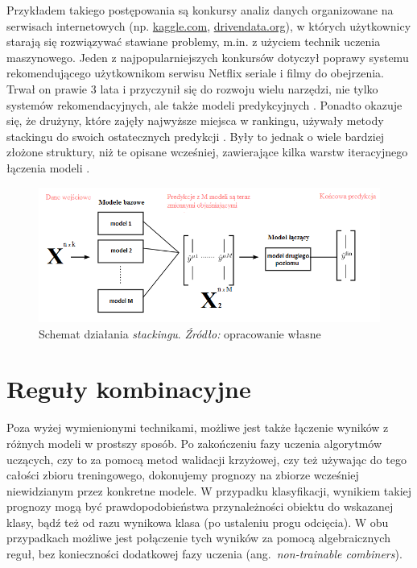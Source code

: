 \documentclass[12pt,a4paper,twoside,openany]{book}
\begin{document}
Przykładem takiego postępowania są konkursy analiz danych organizowane na serwisach internetowych (np. \url{kaggle.com}, \url{drivendata.org}), w których użytkownicy starają się rozwiązywać stawiane problemy, m.in. z użyciem technik uczenia maszynowego. Jeden z najpopularniejszych konkursów dotyczył poprawy systemu rekomendującego użytkownikom serwisu Netflix seriale i filmy do obejrzenia. Trwał on prawie 3 lata i przyczynił się do rozwoju wielu narzędzi, nie tylko systemów rekomendacyjnych, ale także modeli predykcyjnych \citep{bell2007,bennett2007}. Ponadto okazuje się, że drużyny, które zajęły najwyższe miejsca w rankingu, używały metody stackingu do swoich ostatecznych predykcji \citep{jahrer2010}. Były to jednak o wiele bardziej złożone struktury, niż te opisane wcześniej, zawierające kilka warstw iteracyjnego łączenia modeli \citep{toscher2009}.

\begin{figure}
\centering
\includegraphics[scale=0.85]{./rys007}
\caption{Schemat działania \textit{stackingu}. \textit{Źródło:} opracowanie własne}\label{rys007}
\end{figure}

\section{Reguły kombinacyjne}

Poza wyżej wymienionymi technikami, możliwe jest także łączenie wyników z różnych modeli w prostszy sposób. Po zakończeniu fazy uczenia algorytmów uczących, czy to za pomocą metod walidacji krzyżowej, czy też używając do tego całości zbioru treningowego, dokonujemy prognozy na zbiorze wcześniej niewidzianym przez konkretne modele. W przypadku klasyfikacji, wynikiem takiej prognozy mogą być prawdopodobieństwa przynależności obiektu do wskazanej klasy, bądź też od razu wynikowa klasa (po ustaleniu progu odcięcia). W obu przypadkach możliwe jest połączenie tych wyników za pomocą algebraicznych reguł, bez konieczności dodatkowej fazy uczenia (ang.~\textit{non-trainable combiners}).
\end{document}
